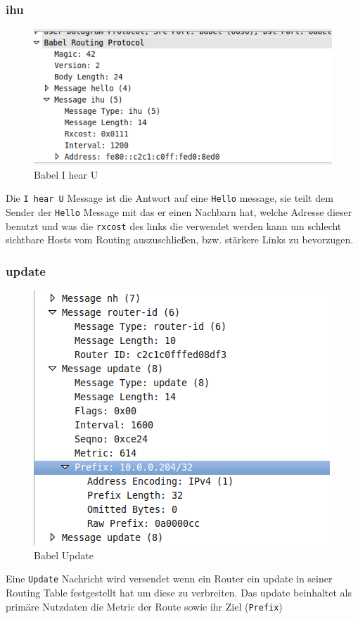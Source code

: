 \documentclass[10pt]{scrartcl}
\begin{document}
	\subsubsection{ihu}
	\begin{figure}[H]
        \centering
                \includegraphics[scale=0.5]{img/babel_ihu}
        \caption{Babel I hear U}
        \label{img:testAufbau}
	\end{figure}
	Die \verb!I hear U! Message ist die Antwort auf eine \verb!Hello! message, sie teilt dem Sender der \verb!Hello! Message mit das er einen Nachbarn hat, welche Adresse dieser benutzt und was die \verb!rxcost! des links die verwendet werden kann um schlecht sichtbare Hosts vom Routing auszuschließen, bzw. stärkere Links zu bevorzugen.
	
	\subsubsection{update}	
	\begin{figure}[H]
        \centering
                \includegraphics[scale=0.5]{img/babel_update}
        \caption{Babel Update}
        \label{img:testAufbau}
	\end{figure}
	Eine \verb!Update! Nachricht wird versendet wenn ein Router ein update in seiner Routing Table festgestellt hat um diese zu verbreiten. Das update beinhaltet als primäre Nutzdaten die Metric der Route sowie ihr Ziel (\verb!Prefix!)
	 
\end{document}
